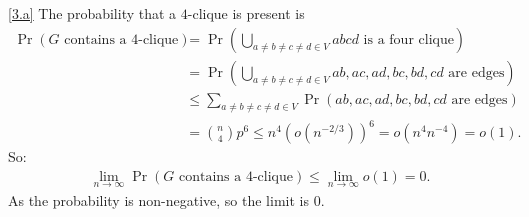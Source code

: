 \documentclass{homework}
\begin{document}
\begin{solution}
\ref{3.a}
The probability that a $4$-clique is present is
\begin{align*}
  \Pr(G \text{ contains a $4$-clique}) &= \Pr(\bigcup_{a\neq b\neq c\neq d\in V} abcd \text{ is a four clique}) \\
  &= \Pr(\bigcup_{a\neq b\neq c\neq d\in V}ab,ac,ad,bc,bd,cd\text{ are edges})\\
  &\le \sum_{a\neq b\neq c\neq d\in V} \Pr(ab,ac,ad,bc,bd,cd\text{ are edges}) \\
  &= \binom{n}{4}p^6 \le n^4 (o(n^{-2/3}))^6 = o(n^4 n^{-4}) = o(1).
\end{align*}
So:
\begin{align*}
  \lim_{n \to \infty} \Pr(G \text{ contains a $4$-clique}) 
  \le \lim_{n \to \infty} o(1)=0.
\end{align*}
As the probability is non-negative, so the limit is $0$.


\end{solution}
\end{document}
